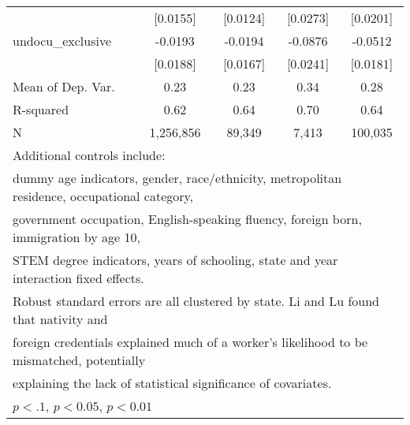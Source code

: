 \begin{table}[htbp]
\begin{tabular}{l*{4}{c}}
                    &    [0.0155]         &    [0.0124]         &    [0.0273]         &    [0.0201]         \\
\addlinespace
undocu\_exclusive    &     -0.0193         &     -0.0194         &     -0.0876\sym{***}&     -0.0512\sym{***}\\
                    &    [0.0188]         &    [0.0167]         &    [0.0241]         &    [0.0181]         \\
\midrule
Mean of Dep. Var.   &        0.23         &        0.23         &        0.34         &        0.28         \\
R-squared           &        0.62         &        0.64         &        0.70         &        0.64         \\
N                   &   1,256,856         &      89,349         &       7,413         &     100,035         \\
\bottomrule
\multicolumn{5}{l}{\footnotesize Additional controls include:}\\
\multicolumn{5}{l}{\footnotesize dummy age indicators, gender, race/ethnicity, metropolitan residence, occupational category,}\\
\multicolumn{5}{l}{\footnotesize government occupation, English-speaking fluency, foreign born, immigration by age 10,}\\
\multicolumn{5}{l}{\footnotesize STEM degree indicators, years of schooling, state and year interaction fixed effects.}\\
\multicolumn{5}{l}{\footnotesize Robust standard errors are all clustered by state. Li and Lu found that nativity and}\\
\multicolumn{5}{l}{\footnotesize foreign credentials explained much of a worker's likelihood to be mismatched, potentially}\\
\multicolumn{5}{l}{\footnotesize explaining the lack of statistical significance of covariates.}\\
\multicolumn{5}{l}{\footnotesize \sym{*} \(p<.1\), \sym{**} \(p<0.05\), \sym{***} \(p<0.01\)}\\
\end{tabular}
\end{table}
